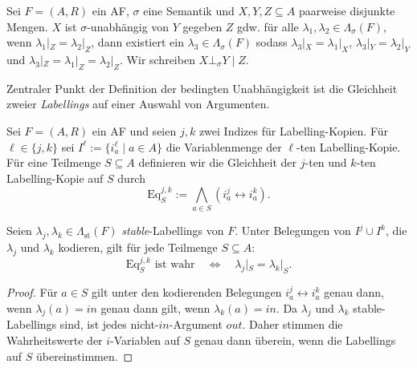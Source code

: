 \begin{Definition}
    \label{def:BU:AFs}
    Sei $F = (A,R)$ ein AF, $\sigma$ eine Semantik und $X,Y,Z \subseteq A$ paarweise disjunkte Mengen. $X$ ist $\sigma$-unabhängig von $Y$
    gegeben $Z$ gdw. für alle $\lambda_1, \lambda_2 \in \Lambda_{\sigma}(F)$, wenn $\lambda_1|_Z=\lambda_2|_Z$, dann existiert ein
    $\lambda_3 \in \Lambda_{\sigma}(F)$ sodass $\lambda_3|_X=\lambda_1|_X$, $\lambda_3|_Y=\lambda_2|_Y$ und $\lambda_3|_Z=\lambda_1|_Z=\lambda_2|_Z$.
    Wir schreiben $X \bot_{\sigma} Y\mid Z$.
\end{Definition}

Zentraler Punkt der Definition der bedingten Unabhängigkeit ist die Gleichheit zweier \textit{Labellings}
auf einer Auswahl von Argumenten. 
\begin{Definition}
    \label{def:eq-qbf}
    Sei \(F=(A,R)\) ein AF und seien \(j,k\) zwei Indizes für
    Labelling-Kopien. Für \(\ell\in\{j,k\}\) sei \(I^\ell := \{i_a^\ell \mid a\in A\}\)
    die Variablenmenge der \(\ell\)-ten Labelling-Kopie. Für eine
    Teilmenge \(S\subseteq A\) definieren wir die Gleichheit der
    \(j\)-ten und \(k\)-ten Labelling-Kopie auf \(S\) durch
    \[
        \mathrm{Eq}^{j,k}_S
        :=
        \bigwedge_{a\in S}
        \left(
            i_a^j \leftrightarrow i_a^k
        \right).
    \]
\end{Definition}

\begin{Lemma}
    \label{lem:eq-qbf-correct}
    Seien \(\lambda_j,\lambda_k\in\Lambda_{\mathrm{st}}(F)\)
    \textit{stable}-Labellings von \(F\). Unter Belegungen von
    \(I^j\cup I^k\), die \(\lambda_j\) und \(\lambda_k\) kodieren, gilt
    für jede Teilmenge \(S\subseteq A\):
    \[
        \mathrm{Eq}^{j,k}_S \text{ ist wahr}
        \quad\Longleftrightarrow\quad
        \lambda_j|_S=\lambda_k|_S.
    \]
\end{Lemma}

\begin{proof}
    \label{pr:eq-qbf-correct}
    Für \(a\in S\) gilt unter den kodierenden Belegungen
    \(i_a^j\leftrightarrow i_a^k\) genau dann, wenn
    \(\lambda_j(a)=\mathit{in}\) genau dann gilt, wenn
    \(\lambda_k(a)=\mathit{in}\). Da \(\lambda_j\) und \(\lambda_k\)
    stable-Labellings sind, ist jedes nicht-\(\mathit{in}\)-Argument
    \(\mathit{out}\). Daher stimmen die Wahrheitswerte der \(i\)-Variablen
    auf \(S\) genau dann überein, wenn die Labellings auf \(S\)
    übereinstimmen.
\end{proof}

